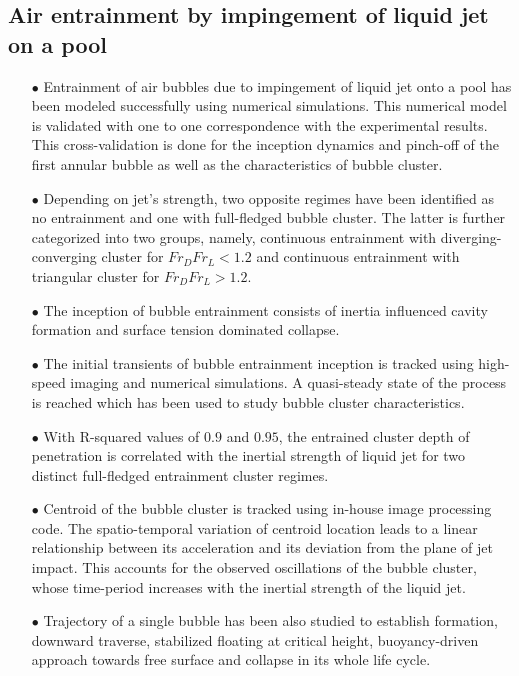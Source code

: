 \subsection{Air entrainment by impingement of liquid jet on a pool}
\begin{enumerate}
\item [$\bullet$] Entrainment of air bubbles due to impingement of liquid jet onto a pool has been modeled successfully using numerical simulations. This numerical model is validated with one to one correspondence with the experimental results. This cross-validation is done for the inception dynamics and pinch-off of the first annular bubble as well as the characteristics of bubble cluster. 
\item [$\bullet$] Depending on jet's strength, two opposite regimes have been identified as no entrainment and one with full-fledged bubble cluster. The latter is further categorized into two groups, namely, continuous entrainment with diverging-converging cluster for $Fr_DFr_L < 1.2$ and continuous entrainment with triangular cluster for $Fr_DFr_L > 1.2$.   
\item [$\bullet$] The inception of bubble entrainment consists of inertia influenced cavity formation and surface tension dominated collapse. 
\item [$\bullet$] The initial transients of bubble entrainment inception is tracked using high-speed imaging and numerical simulations. A quasi-steady state of the process is reached which has been used to study bubble cluster characteristics. 
\item [$\bullet$] With R-squared values of $0.9$ and $0.95$, the entrained cluster depth of penetration is correlated with the inertial strength of liquid jet for two distinct full-fledged entrainment cluster regimes.
\item [$\bullet$] Centroid of the bubble cluster is tracked using in-house image processing code. The spatio-temporal variation of centroid location leads to a linear relationship between its acceleration and its deviation from the plane of jet impact. This accounts for the observed oscillations of the bubble cluster, whose time-period increases with the inertial strength of the liquid jet. 
\item [$\bullet$] Trajectory of a single bubble has been also studied to establish formation, downward traverse, stabilized floating at critical height, buoyancy-driven approach towards free surface and collapse in its whole life cycle.
\end{enumerate}
